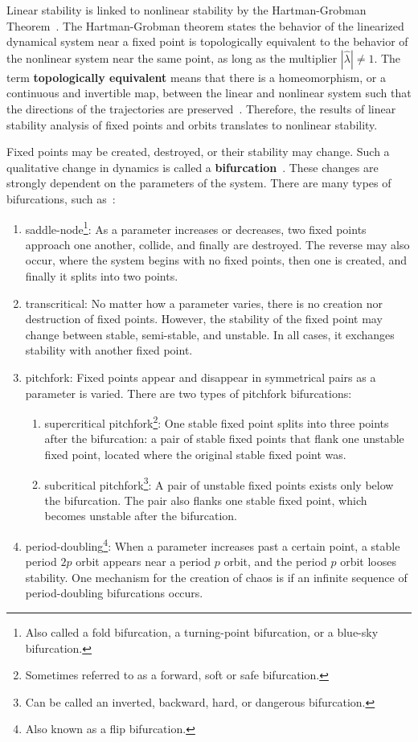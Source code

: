 Linear stability is
linked to nonlinear stability by the Hartman-Grobman
Theorem~\cite{meiss}. The Hartman-Grobman theorem states the behavior of the linearized
dynamical system near a fixed point is topologically equivalent to the
behavior of the nonlinear system near the same point, as long as the
multiplier $|\hat{\lambda}|\neq 1$. The term \textbf{topologically
  equivalent} means that there is a homeomorphism, or a continuous and
invertible map, between the linear and nonlinear system such that the
directions of the trajectories are preserved~\cite{strogatz}. Therefore, the results of linear stability
analysis of fixed points and orbits translates to nonlinear stability. 

Fixed points may be created, destroyed, or their stability may
change. Such a qualitative change in dynamics is called a \textbf{bifurcation}~\cite{strogatz}. These changes are strongly dependent on the
parameters of the system. There are many types of
bifurcations, such as~\cite{strogatz}: 
\begin{enumerate}
\item saddle-node\footnote{Also called a fold bifurcation, a
    turning-point bifurcation, or a blue-sky bifurcation.}: As a parameter increases or decreases, two fixed
  points approach one another, collide, and finally are destroyed. The
  reverse may also occur, where the system begins with no fixed
  points, then one is created, and finally it splits into two points. 
\item transcritical: No matter how a parameter varies, there is no
  creation nor destruction of fixed points. However, the stability of
  the fixed point may change between stable, semi-stable, and unstable. In all cases, it
  exchanges stability with another fixed point. 
\item pitchfork: Fixed points appear and disappear in
  symmetrical pairs as a parameter is varied. There are two types of
  pitchfork bifurcations:
\begin{enumerate} 
\item supercritical pitchfork\footnote{Sometimes referred to as a
    forward, soft or safe bifurcation.}: One stable fixed point splits into
  three points after the bifurcation: a pair
  of stable fixed points that flank one unstable fixed point, located
  where the original stable fixed point was. 
\item subcritical pitchfork\footnote{Can be called an inverted,
    backward, hard, or dangerous bifurcation.}: A pair of unstable fixed points exists only below
  the bifurcation. The pair also flanks one stable fixed point, which
  becomes unstable after the bifurcation.
\end{enumerate}
\item period-doubling\footnote{Also known as a flip bifurcation.}:
  When a parameter increases past a certain point, a stable period
  $2p$ orbit appears near a period $p$ orbit, and the period $p$ orbit looses stability. One mechanism for the creation of chaos is if
  an infinite sequence of period-doubling bifurcations occurs. 
\end{enumerate}
